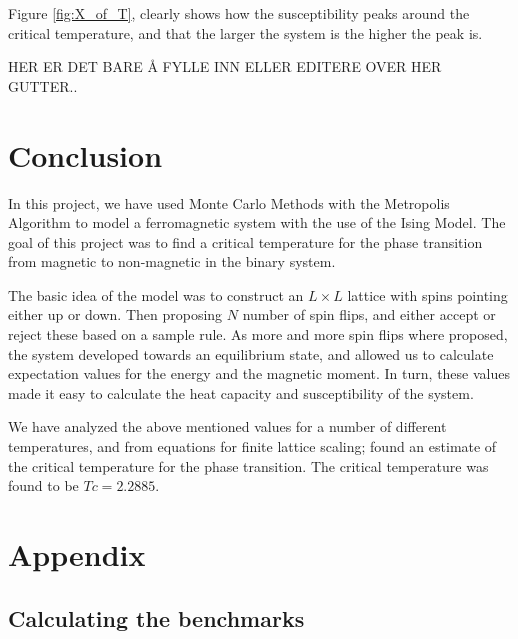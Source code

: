 \documentclass[12pt,english,a4paper]{article}
\begin{document}
Figure \ref{fig:X_of_T}, clearly shows how the susceptibility peaks around the critical temperature, and that the larger the system is the higher the peak is. 

HER ER DET BARE Å FYLLE INN ELLER EDITERE OVER HER GUTTER.. 

\section{Conclusion} \label{conclusion}

In this project, we have used Monte Carlo Methods with the Metropolis Algorithm to model a ferromagnetic system with the use of the Ising Model. The goal of this project was to find a critical temperature for the phase transition from magnetic to non-magnetic in the binary system.

The basic idea of the model was to construct an $L \times L$ lattice with spins pointing either up or down. Then proposing $N$ number of spin flips, and either accept or reject these based on a sample rule. As more and more spin flips where proposed, the system developed towards an equilibrium state, and allowed us to calculate expectation values for the energy and the magnetic moment. In turn, these values made it easy to calculate the heat capacity and susceptibility of the system. 

We have analyzed the above mentioned values for a number of different temperatures, and from equations for finite lattice scaling; found an estimate of the critical temperature for the phase transition. The critical temperature was found to be $Tc = 2.2885$.


\section{Appendix} \label{appendix}

\subsection{Calculating the benchmarks}
\end{document}

